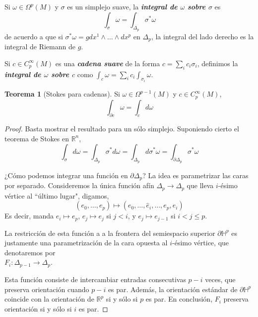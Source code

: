 \documentclass[spanish]{article}
\theoremstyle{definition}
\newtheorem*{teo}{Teorema}
\newcommand{\R}{\mathbb{R}}
\begin{document}
	Si $\omega\in\Omega^p(M)$ y $\sigma$ es un simplejo suave, la \textbf{\textit{integral de $\omega$ sobre $\sigma$}} es
	\[\int_\sigma \omega=\int_{\Delta_p}\sigma^*\omega\]
	de acuerdo a que si $\sigma^*\omega=gdx^1\wedge\ldots\wedge dx^p$ en $\Delta_p$, la integral del lado derecho es la integral de Riemann de $g$.
	
	Si $c\in C_p^\infty(M)$ es una \textbf{\textit{cadena suave}} de la forma $c=\sum_ic_i\sigma_i$, definimos la \textbf{\textit{integral de $\omega$ sobre $c$}} como $\int_c\omega=\sum_ic_i\int_{\sigma_i}\omega$.
	
	\begin{teo}[Stokes para cadenas]
		Si $\omega\in\Omega^{p-1}(M)$ y $c\in C^\infty_p(M)$,
		\[\int_{\partial c}\omega=\int_cd\omega\]
	\end{teo}
	\begin{proof}
		Basta mostrar el resultado para un sólo simplejo. Suponiendo cierto el teorema de Stokes en $\R^n$,
		\[\int_{\sigma}d\omega=\int_{\Delta_p}\sigma^*d\omega=\int_{\Delta_p}d\sigma^*\omega=\int_{\partial \Delta_p}\sigma^*\omega\]
		
		¿Cómo podemos integrar una función en $\partial\Delta_p$? La idea es parametrizar las caras por separado. Consideremos la única función afín $\Delta_p\to\Delta_p$ que lleva $i$-ésimo vértice al ``último lugar", digamos,
		\[(e_0,\ldots,e_p)\mapsto (e_0,\ldots,\hat{e}_i,\ldots,e_p,e_i)\]
		Es decir, manda $e_i\mapsto e_p$, $e_j\mapsto e_j$ si $j<i$, y $e_j\mapsto e_{j-1}$ si $i<j\leq p$.
		
		La restricción de esta función a a la frontera del semiespacio superior $\partial\mathbb{H}^p$ es justamente una parametrización de la cara opuesta al $i$-ésimo vértice, que denotaremos por\\ $F_{i}:\Delta_{p-1}\to\Delta_p$.
		
		Esta función consiste de intercambiar entradas consecutivas $p-i$ veces, que preserva orientación cuando $p-i$ es par. Además, la orientación estándar de $\partial\mathbb{H}^p$ coincide con la orientación de $\R^p$ si y sólo si $p$ es par. En conclusión, $F_i$ preserva orientación si y sólo si $i$ es par.
		
		

\end{proof}
\end{document}
